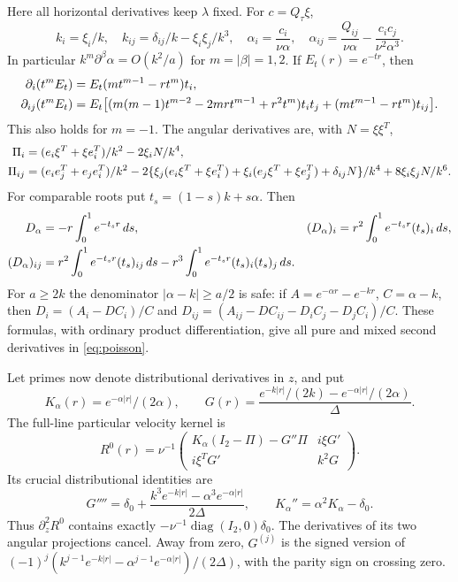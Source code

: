 \documentclass[11pt]{article}
\numberwithin{equation}{section}
\theoremstyle{remark}
\newcommand{\diag}{\operatorname{diag}}
\begin{document}
Here all horizontal derivatives keep $\lambda$ fixed. For $c=Q_\tau\xi$,
\begin{equation}\label{eq:root-jets}
 k_i=\xi_i/k,\quad k_{ij}=\delta_{ij}/k-\xi_i\xi_j/k^3,\quad
 \alpha_i=\frac{c_i}{\nu\alpha},\quad
 \alpha_{ij}=\frac{Q_{ij}}{\nu\alpha}-\frac{c_ic_j}{\nu^2\alpha^3}.
\end{equation}
In particular $k^m\partial^\beta\alpha=O(k^2/a)$ for
$m=|\beta|=1,2$. If $E_t(r)=e^{-tr}$, then
\begin{align}\label{eq:exponential-jets}
 \partial_i(t^mE_t)&=E_t(mt^{m-1}-rt^m)t_i,\\
 \partial_{ij}(t^mE_t)&=E_t\bigl[
 (m(m-1)t^{m-2}-2mr t^{m-1}+r^2t^m)t_it_j
 +(mt^{m-1}-rt^m)t_{ij}\bigr].\notag
\end{align}
This also holds for $m=-1$. The angular derivatives are, with $N=\xi\xi^T$,
\begin{align}\label{eq:angular-jets}
 \Pi_i&=(e_i\xi^T+\xi e_i^T)/k^2-2\xi_iN/k^4,\\
 \Pi_{ij}&=(e_ie_j^T+e_je_i^T)/k^2
 -2\{\xi_j(e_i\xi^T+\xi e_i^T)+\xi_i(e_j\xi^T+\xi e_j^T)
 +\delta_{ij}N\}/k^4+8\xi_i\xi_jN/k^6.\notag
\end{align}
For comparable roots put $t_s=(1-s)k+s\alpha$. Then
\begin{align}\label{eq:divided-jets}
 D_\alpha&=-r\int_0^1e^{-t_sr}\,ds,&
 (D_\alpha)_i&=r^2\int_0^1e^{-t_sr}(t_s)_i\,ds,\\
 (D_\alpha)_{ij}&=r^2\int_0^1e^{-t_sr}(t_s)_{ij}\,ds
 -r^3\int_0^1e^{-t_sr}(t_s)_i(t_s)_j\,ds.\notag
\end{align}
For $a\geq2k$ the denominator $|\alpha-k|\geq a/2$ is safe:
if $A=e^{-\alpha r}-e^{-kr}$, $C=\alpha-k$, then
$D_i=(A_i-DC_i)/C$ and
$D_{ij}=(A_{ij}-DC_{ij}-D_iC_j-D_jC_i)/C$.
These formulas, with ordinary product differentiation, give all pure
and mixed second derivatives in \eqref{eq:poisson}.

Let primes now denote distributional derivatives in $z$, and put
\[
 K_\alpha(r)=e^{-\alpha|r|}/(2\alpha),\qquad
 G(r)=\frac{e^{-k|r|}/(2k)-e^{-\alpha|r|}/(2\alpha)}{\Delta}.
\]
The full-line particular velocity kernel is
\begin{equation}\label{eq:full-line}
 R^0(r)=\nu^{-1}\begin{pmatrix}
 K_\alpha(I_2-\Pi)-G''\Pi&i\xi G'\\
 i\xi^TG'&k^2G
 \end{pmatrix}.
\end{equation}
Its crucial distributional identities are
\begin{equation}\label{eq:delta-identity}
 G''''=\delta_0+\frac{k^3e^{-k|r|}-\alpha^3e^{-\alpha|r|}}{2\Delta},
 \qquad K_\alpha''=\alpha^2K_\alpha-\delta_0.
\end{equation}
Thus $\partial_z^2R^0$ contains exactly
$-\nu^{-1}\diag(I_2,0)\delta_0$. The derivatives of its two angular
projections cancel. Away from zero,
$G^{(j)}$ is the signed version of
$(-1)^j(k^{j-1}e^{-k|r|}-\alpha^{j-1}e^{-\alpha|r|})/(2\Delta)$,
with the parity sign on crossing zero.
\end{document}
